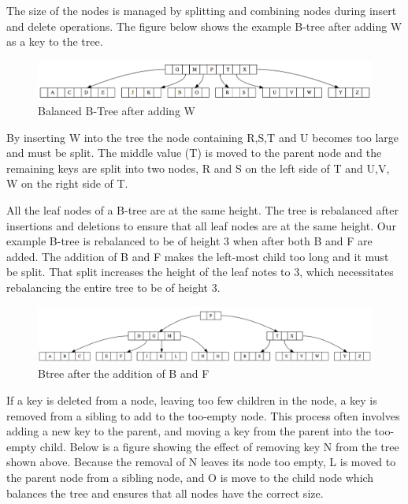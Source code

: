 The size of the nodes is managed by splitting and combining nodes during insert and delete operations.   The figure below shows the example B-tree after adding W as a key to the tree.  

\begin{figure}[H]
\centering
\includegraphics[width=\textwidth]{pictures/btree2.png}
\caption{Balanced B-Tree after adding W}
\label{fig:tree24}
\end{figure}

By inserting W into the tree the node containing R,S,T and U becomes too large and must be split.  The middle value (T) is  moved to the parent node and the remaining keys are split into two nodes,  R and S on the left side of T and U,V, W on the right side of T.    

All the leaf nodes of a B-tree are at the same height.  The tree is rebalanced after insertions and deletions to ensure that all leaf nodes are at the same height.    Our example B-tree is rebalanced to be of height 3 when after both B and F are added.  The addition of B and F makes the left-most child too long and it must be split.  That split increases the height of the leaf notes to 3, which necessitates rebalancing the entire tree to be of height 3.

\begin{figure}[H]
\centering
\includegraphics[width=\textwidth]{pictures/btree3.png}
\caption{Btree after the addition of B and F}
\label{fig:btree3}
\end{figure}


If a key is deleted from a node, leaving too few children in the node, a key is removed from a sibling to add to the too-empty node. This process often involves adding a new key to the parent, and moving a key from the parent into the too-empty child. Below is a figure showing the effect of removing key N from the tree shown above.   Because the removal of N leaves its node too empty, L is moved to the parent node from a sibling node, and O is  move to the child node which balances the tree and ensures that all nodes have the correct size. 

